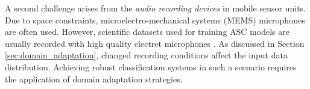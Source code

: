 \documentclass[applsci,article,submit,oneauthor,pdftex]{Definitions/mdpi}
\newcommand{\secref}[1]{{Section \ref{#1}}}
\begin{document}
A second challenge arises from the  \textit{audio recording devices} in mobile sensor units. Due to space constraints, microelectro-mechanical systems (MEMS) microphones are often used.
However, scientific datasets used for training ASC models are usually recorded with high quality electret microphones \citep{Mesaros:2018:MultiDeviceDataset:DCASE}.
As discussed in \secref{sec:domain_adaptation}, changed recording conditions affect the input data distribution. Achieving robust classification systems in such a scenario requires the application of domain adaptation strategies.








    
\end{document}

